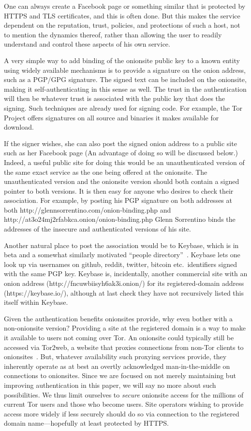 \documentclass[10pt]{styles/IEEEtran}
\begin{document}
One can always create a Facebook page or something similar
that is protected by HTTPS and TLS certificates,
and this is often done.  But this makes the service dependent on the
reputation, trust, policies, and protections of such a host, not to mention
the dynamics thereof, rather than allowing the user to readily understand
and control these aspects of his own service. 

A very simple way to add binding of the onionsite public key to
a known entity using widely available mechanisms is to provide a
signature on the onion address, such as a PGP/GPG signature.
The signed text can be
included on the onionsite, making it self-authenticating in this sense
as well. The trust in the authentication will then be whatever trust
is associated with the public key that does the signing. Such
techniques are already used for signing code. For example,
the Tor Project offers signatures on all source and binaries
it makes available for download. 

If the signer wishes, she can also post the signed onion address to a
public site such as her Facebook page (An advantage of doing so will
be discussed below.) Indeed, a useful public site for
doing this would be an unauthenticated version of the same exact
service as the one being offered at the onionsite.  The
unauthenticated version and the onionsite version should both contain
a signed pointer to both versions. It is then easy for anyone who
desires to check their association.  For example, by posting his PGP
signature on both addresses at both
http://glennsorrentino.com/onion-binding.php and
http://at3o24mj2rfabkca.onion/onion-binding.php Glenn Sorrentino binds
the addresses of the insecure and authenticated versions of his site.

Another natural place to post the association would be to Keybase,
which is in beta and a somewhat similarly motivated ``people
directory''~\cite{keybase}. Keybase lets one look up via usernames on
github, reddit, twitter, bitcoin etc.\ identifiers signed with the
same PGP key. Keybase is, incidentally, another commercial site with
an onion address (http://fncuwbiisyh6ak3i.onion/) for its
registered-domain address (https://keybase.io/), although at last
check they have not recursively listed this itself within Keybase.

Given the authentication benefits onionsites provide, why even bother
with a non-onionsite version? 
Providing a site at the registered domain is a way
to make it available to users not coming over Tor.
An onionsite could typically still be accessed via Tor2web, a website
that proxies connections from non-Tor clients to
onionsites~\cite{tor2web}.  But, whatever availability such proxying
services provide, they inherently operate as at best an overtly
acknowledged man-in-the-middle on connections to onionsites.  Since we
are focused on not merely maintaining but improving authentication in
this paper, we will say no more about such possibilities. We thus
limit ourselves to \emph{secure} onionsite access for the millions of
current Tor users and those who become users. Site operators wishing to
provide access more widely if less securely should do so via connection
to the registered domain name---hopefully at least protected by HTTPS.
\end{document}
